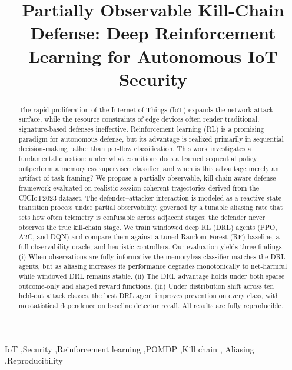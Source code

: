 \documentclass[3p,twocolumn]{elsarticle}
\begin{document}
\begin{frontmatter}

\title{Partially Observable Kill-Chain Defense: Deep Reinforcement
Learning for Autonomous IoT Security}

\author{}

\begin{abstract}
The rapid proliferation of the Internet of Things (IoT) expands the network
attack surface, while the resource constraints of edge devices often render
traditional, signature-based defenses ineffective. Reinforcement learning (RL)
is a promising paradigm for autonomous defense, but its advantage is realized
primarily in sequential decision-making rather than per-flow classification.
This work investigates a fundamental question: under what conditions does a
learned sequential policy outperform a memoryless supervised classifier, and
when is this advantage merely an artifact of task framing? We propose a
partially observable, kill-chain-aware defense framework evaluated on realistic
session-coherent trajectories derived from the CICIoT2023 dataset. The
defender--attacker interaction is modeled as a reactive state-transition
process under partial observability, governed by a tunable aliasing rate that
sets how often telemetry is confusable across adjacent stages; the defender
never observes the true kill-chain stage. We train
windowed deep RL (DRL) agents (PPO, A2C, and DQN) and compare them against a
tuned Random Forest (RF) baseline, a full-observability oracle, and heuristic
controllers. Our evaluation yields three findings. (i) When observations are
fully informative the memoryless classifier matches the DRL agents, but as
aliasing increases its performance degrades monotonically to net-harmful while
windowed DRL remains stable. (ii) The DRL advantage holds under both sparse
outcome-only and shaped reward functions. (iii) Under distribution shift across
ten held-out attack classes, the best DRL agent improves prevention on every
class, with no statistical dependence on baseline detector recall. All results
are fully reproducible.
\end{abstract}

\begin{keyword}
IoT \sep Security \sep Reinforcement learning \sep POMDP \sep Kill chain \sep
Aliasing \sep Reproducibility
\end{keyword}

\end{frontmatter}
\end{document}
